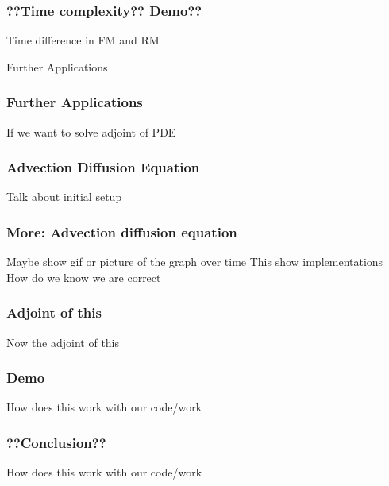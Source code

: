 \documentclass{beamer}
\begin{document}
\begin{frame}
\frametitle{??Time complexity?? Demo??}
Time difference in FM and RM
\end{frame}

\begin{frame}{Further Applications}
\frametitle{Further Applications}
If we want to solve adjoint of PDE
\end{frame}

\begin{frame}
\frametitle{Advection Diffusion Equation}
Talk about initial setup
\end{frame}

\begin{frame}
\frametitle{More: Advection diffusion equation}
Maybe show gif or picture of the graph over time
This show implementations
How do we know we are correct
\end{frame}

\begin{frame}
\frametitle{Adjoint of this}
Now the adjoint of this
\end{frame}

\begin{frame}
\frametitle{Demo}
How does this work with our code/work
\end{frame}

\begin{frame}
\frametitle{??Conclusion??}
How does this work with our code/work
\end{frame}
\end{document}
